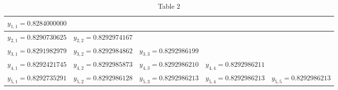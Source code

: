 \begin{table}[h]
\centering
\begin{tabular}{|l|l|l|l|l|}
\hline
\multicolumn{5}{|l|}{\footnotesize$y_{1,1}=0.8284000000$} \\
\hline
\footnotesize$y_{2,1}=0.8290730625$ &\footnotesize $y_{2,2}=0.8292974167$ &  &  &  \\
\hline
\footnotesize$y_{3,1}=0.8291982979$ &\footnotesize $y_{3,2}=0.8292984862$ &\footnotesize $y_{3,3}=0.8292986199$ &  &  \\
\hline
\footnotesize$y_{4,1}=0.8292421745$ &\footnotesize $y_{4,2}=0.8292985873$ &\footnotesize $y_{4,3}=0.8292986210$ &\footnotesize $y_{4,4}=0.8292986211$ &  \\
\hline
\footnotesize $y_{5,1}=0.8292735291$ &\footnotesize $y_{5,2}=0.8292986128$ &\footnotesize $y_{5,3}=0.8292986213$ &\footnotesize $y_{5,4}=0.8292986213$ &\footnotesize $y_{5,5}=0.8292986213$ \\
\hline
\end{tabular}
\caption{\scriptsize Table $2$}
\label{tab:extrapolmethtab2}
\end{table}



